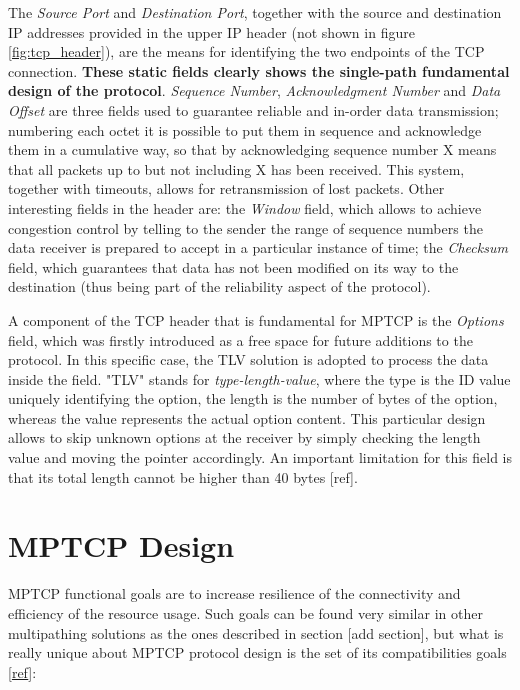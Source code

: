 The \textit{Source Port} and \textit{Destination Port}, together with the source and destination IP addresses provided in the upper IP header (not shown in figure \ref{fig:tcp_header}), are the means for identifying the two endpoints of the TCP connection. \textbf{These static fields clearly shows the single-path fundamental design of the protocol}. \textit{Sequence Number}, \textit{Acknowledgment Number} and \textit{Data Offset} are three fields used to guarantee reliable and in-order data transmission; numbering each octet it is possible to put them in sequence and acknowledge them in a cumulative way, so that by acknowledging sequence number X means that all packets up to but not including X has been received. This system, together with timeouts, allows for retransmission of lost packets.
Other interesting fields in the header are: the \textit{Window} field, which allows to achieve congestion control by telling to the sender the range of sequence numbers the data receiver is prepared to accept in a particular instance of time; the \textit{Checksum} field, which guarantees that data has not been modified on its way to the destination (thus being part of the reliability aspect of the protocol).


A component of the TCP header that is fundamental for MPTCP is the \textit{Options} field, which was firstly introduced as a free space for future additions to the protocol. In this specific case, the TLV solution is adopted to process the data inside the field. "TLV" stands for \textit{type-length-value}, where the type is the ID value uniquely identifying the option, the length is the number of bytes of the option, whereas the value represents the actual option content. This particular design allows to skip unknown options at the receiver by simply checking the length value and moving the pointer accordingly. An important limitation for this field is that its total length cannot be higher than 40 bytes [ref].

\section{MPTCP Design}
MPTCP functional goals are to increase resilience of the connectivity and efficiency of the resource usage.
Such goals can be found very similar in other multipathing solutions as the ones described in section [add section], but what is really unique about MPTCP protocol design is the set of its compatibilities goals [\href{https://tools.ietf.org/html/rfc6182}{ref}]:

